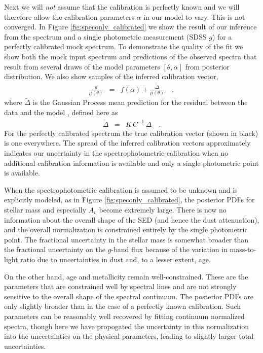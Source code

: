 \documentclass[iop,numberedappendix]{emulateapj}
\begin{document}
Next we will \emph{not} assume that the calibration is perfectly known
and we will therefore allow the calibration parameters $\alpha$ in our
model to vary.  {\color{red} This is not converged.} In Figure
\ref{fig:speconly_calibrated} we show the result of our inference from
the spectrum and a single photometric measurement (SDSS $g$) for a
perfectly calibrated mock spectrum. To demonstrate the quality of the
fit we show both the mock input spectrum and predictions of the
observed spectra that result from several draws of the model
parameters $[\theta, \alpha]$ from posterior distribution.  We also
show samples of the inferred calibration vector,
\begin{eqnarray} \label{eq:calibration}
\frac{d}{\mu(\theta)} & = & f(\alpha) + \frac{\tilde{\Delta}}{\mu(\theta)}
\quad ,
\end{eqnarray}
where $\tilde{\Delta}$ is the Gaussian Process mean prediction for the
residual between the data and the model \citep{RW},
defined here as 
\begin{eqnarray} \label{eq:calibration}
\tilde{\Delta} & = & K \, C^{-1} \, \Delta
\quad .
\end{eqnarray}
For the perfectly calibrated spectrum the true calibration vector
(shown in black) is one everywhere.  The spread of the inferred
calibration vectors approximately indicates our uncertainty in the
spectrophotometric calibration when no additional calibration
information is available and only a single photometric point is
available.

When the spectrophotometric calibration is assumed to be unknown and
is explicitly modeled, as in Figure \ref{fig:speconly_calibrated}, the
posterior PDFs for stellar mass and especially $A_v$ become extremely
large.  There is now no information about the overall shape of the SED
(and hence the dust attenuation), and the overall normalization is
constrained entirely by the single photometric point.  The fractional
uncertainty in the stellar mass is somewhat broader than the
fractional uncertainty on the $g$-band flux because of the variation
in mass-to-light ratio due to uncertainties in dust and, to a lesser
extent, age.

On the other hand, age and metallicity remain well-constrained.  These
are the parameters that are constrained well by spectral lines and are
not strongly sensitive to the overall shape of the spectral continuum.
The posterior PDFs are only slightly broader than in the case of a
perfectly known calibration. Such parameters can be reasonably well
recovered by fitting continuum normalized spectra, though here we have
propogated the uncertainty in this normalization into the
uncertainties on the physical parameters, leading to slightly larger
total uncertainties.
\end{document}
